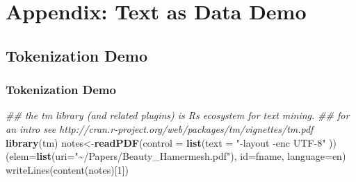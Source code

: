 \documentclass[
  shownotes,
  xcolor={svgnames},
  hyperref={colorlinks,citecolor=DarkBlue,linkcolor=DarkRed,urlcolor=DarkBlue}
  , aspectratio=169]{beamer}
\newenvironment{Shaded}{\begin{snugshade}}{\end{snugshade}}
\newcommand{\CommentTok}[1]{\textcolor[rgb]{0.56,0.35,0.01}{\textit{#1}}}
\newcommand{\DataTypeTok}[1]{\textcolor[rgb]{0.13,0.29,0.53}{#1}}
\newcommand{\KeywordTok}[1]{\textcolor[rgb]{0.13,0.29,0.53}{\textbf{#1}}}
\newcommand{\NormalTok}[1]{#1}
\newcommand{\StringTok}[1]{\textcolor[rgb]{0.31,0.60,0.02}{#1}}
\begin{document}
\section{Appendix: Text as Data Demo}
\subsection{Tokenization Demo}
\begin{frame}[fragile]
\frametitle{Tokenization Demo}

\begin{scriptsize}


\begin{Shaded}
\begin{Highlighting}[]
\CommentTok{\#\# the tm library (and related plugins) is R\textquotesingle{}s ecosystem for text mining.}
\CommentTok{\#\# for an intro see http://cran.r{-}project.org/web/packages/tm/vignettes/tm.pdf}
\KeywordTok{library}\NormalTok{(tm) }
\NormalTok{notes\textless{}{-}}\KeywordTok{readPDF}\NormalTok{(}\DataTypeTok{control =} \KeywordTok{list}\NormalTok{(}\DataTypeTok{text =} \StringTok{"{-}layout {-}enc UTF{-}8"}
  \NormalTok{))(}\DataTypeTok{elem=}\KeywordTok{list}\NormalTok{(}\DataTypeTok{uri=}\StringTok{"\textasciitilde{}/Papers/Beauty\_Hamermesh.pdf"}\NormalTok{), }\DataTypeTok{id=}\NormalTok{fname, }
  \DataTypeTok{language=}\StringTok{\textquotesingle{}en\textquotesingle{}}\NormalTok{)}
writeLines(content(notes)[1]) 
\end{Highlighting}
\end{Shaded}
\end{scriptsize}
\begin{tiny}




\end{tiny}
\end{frame}
\end{document}
